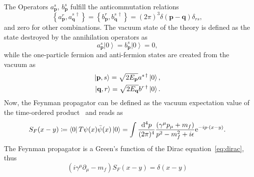 The Operators $a^{s}_{\mathbf{p}}$, $b^{s}_{\mathbf{p}}$ fulfill the anticommutation relations
\begin{equation}
\left\{ a^{r}_\mathbf{p},a^{s\,\dagger}_\mathbf{q}\right\} = \left\{ b^{r}_\mathbf{p},b^{s\,\dagger}_\mathbf{q}\right\} = (2\pi)^3 \delta (\mathbf{p}-\mathbf{q})\delta_{rs},
\end{equation}
and zero for other combinations. The vacuum state of the theory is defined as the state destroyed by the annihilation operators as
\begin{equation}
a^s_\mathbf{p}\left|0\right> = b^s_\mathbf{p}\left|0\right> = 0,
\end{equation}
while the one-particle fermion and anti-fermion states are created from the vacuum as
\begin{align}
\left|\mathbf{p},s\right> = \sqrt{2E_\mathbf{p}}a^{s\,\dagger}\left|0\right>,\notag\\
\left|\mathbf{q},r\right> = \sqrt{2E_\mathbf{q}}b^{r\,\dagger}\left|0\right>.
\end{align}
Now, the Feynman propagator can be defined as the vacuum expectation value of the time-ordered product~\cite[Section 3.5.]{peskin1995} and reads as
\begin{equation}
S_F(x-y)\coloneqq \left<0\right|T\psi(x)\bar{\psi}(x)\left|0\right>=\int \frac{\mathrm{d}^4p}{(2\pi)^4}\frac{ (\gamma^\mu p_\mu+m_f)}{p^2-m_f^2+i\epsilon}\text{e}^{-ip\cdot(x-y)}.
\label{eq:freepropdef}
\end{equation}
The Feynman propagator is a Green's function of the Dirac equation~\eqref{eq:dirac}, thus
\begin{equation}
\left(i\gamma^\mu \partial_\mu -m_f\right)S_F(x-y)=\delta(x-y)
\label{eq:freeprop}
\end{equation} 
